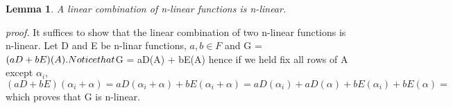 \documentclass[12pt, letterpaper]{article}
\newtheorem{lemma}[theorem]{Lemma}
\begin{document}
			\begin{lemma}
				A linear combination of n-linear functions is n-linear.
			\end{lemma}
			\textit{proof.} It suffices to show that the linear combination of two n-linear functions is n-linear. Let D and E be n-linar functions, $a, b \in F$ and G = $(aD + bE)(A).
			\newline Notice  that $G = aD(A) + bE(A)$ $ hence if we held fix all rows of A except $\alpha_{i}$, $(aD + bE)(\alpha_{i} + \alpha) = aD(\alpha_{i} + \alpha) + bE(\alpha_{i} + \alpha) = aD(\alpha_{i}) + aD(\alpha) + bE(\alpha_{i}) + bE(\alpha) =  $  which proves that G is n-linear.
				
			
			
			
			
			
			
			
			
			
			
		
		
		
		
		
		
		
		
\end{document}
